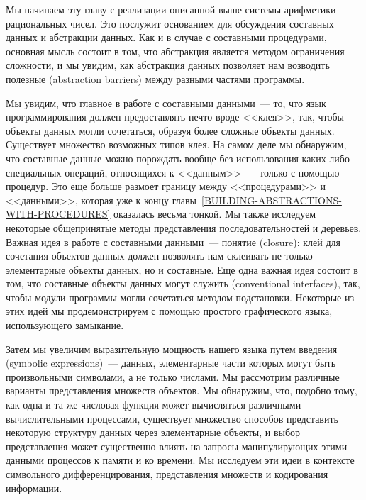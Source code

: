 Мы начинаем эту главу с реализации описанной выше системы
арифметики рациональных чисел.  Это послужит основанием для
обсуждения составных данных и абстракции данных.  Как и в
случае с составными процедурами, основная мысль состоит в том, что
абстракция является методом ограничения сложности, и мы увидим, как
абстракция данных позволяет нам возводить полезные 
 (abstraction barriers) между разными
частями программы.

Мы увидим, что главное в работе с составными данными~--- то,
что язык программирования должен предоставлять нечто вроде <<клея>>,
так, чтобы объекты данных могли сочетаться, образуя более сложные
объекты данных.  Существует множество возможных типов клея.
На самом деле мы обнаружим, что составные данные можно порождать
вообще без использования каких-либо специальных операций, относящихся к
<<данным>>~--- только с помощью процедур.  Это еще больше размоет границу между
<<процедурами>> и <<данными>>, которая уже к концу главы~\ref{BUILDING-ABSTRACTIONS-WITH-PROCEDURES} оказалась
весьма тонкой.  Мы также исследуем некоторые общепринятые методы
представления последовательностей и деревьев.  Важная идея в работе с
составными данными~--- понятие  (closure): клей для
сочетания объектов данных должен позволять нам склеивать не только
элементарные объекты данных, но и составные.  Еще одна важная идея
состоит в том, что составные объекты данных могут служить 
 (conventional interfaces), так,
чтобы модули программы могли сочетаться методом подстановки.
Некоторые из этих идей мы продемонстрируем с помощью простого
графического языка, использующего замыкание.

Затем мы увеличим выразительную мощность нашего языка путем
введения    (symbolic expressions)~--- данных,
элементарные части которых могут быть произвольными символами, а не
только числами.  Мы рассмотрим различные варианты представления
множеств объектов.  Мы обнаружим, что, подобно тому, как одна и та же
числовая функция может вычисляться различными вычислительными
процессами, существует множество способов представить некоторую
структуру данных через элементарные объекты, и выбор представления
может существенно влиять на запросы манипулирующих  
этими данными процессов к памяти и ко времени.  Мы исследуем эти идеи в
контексте символьного дифференцирования, представления множеств и
кодирования информации.

